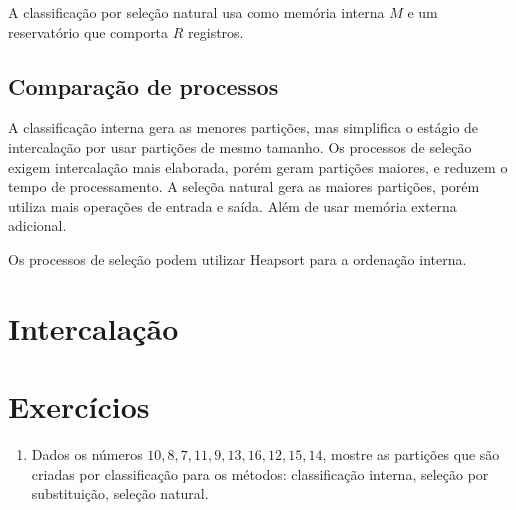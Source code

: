A classificação por seleção natural usa como memória interna $M$ e um reservatório
que comporta $R$ registros.

\subsection{Comparação de processos}

A classificação interna gera as menores partições, mas simplifica o estágio
de intercalação por usar partições de mesmo tamanho.
Os processos de seleção exigem intercalação mais elaborada, porém geram 
partições maiores, e reduzem o tempo de processamento.
A seleçõa natural gera as maiores partições, porém utiliza mais operações de 
entrada e saída. Além de usar memória externa adicional.

Os processos de seleção podem utilizar Heapsort para a ordenação interna.

\section{Intercalação}

\section{Exercícios}

\begin{enumerate}
\item Dados os números $10, 8, 7, 11, 9, 13, 16, 12, 15, 14$, mostre as partições
que são criadas por classificação para os métodos: classificação interna, seleção
por substituição, seleção natural.

\end{enumerate}
